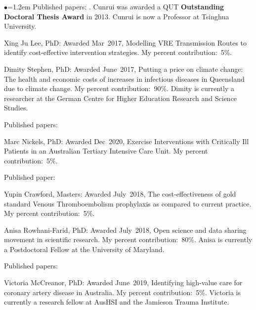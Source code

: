 \documentclass[a4paper,11pt]{article}
\renewcommand{\labelitemi}{$\bullet$}
\begin{document}
\begin{raggedright}
\begin{list}{\labelitemi}{\leftmargin=1.2em}
Published papers: . Cunrui was awarded a QUT \textbf{Outstanding Doctoral Thesis Award} in 2013. Cunrui is now a Professor at Tsinghua University.

\item Xing Ju Lee, PhD: Awarded Mar~2017, Modelling VRE Transmission Routes to identify cost-effective intervention strategies. My percent contribution:~5\%.

\item Dimity Stephen, PhD: Awarded June~2017, Putting a price on climate change: The health and economic costs of increases in infectious diseases in Queensland due to climate change. My percent contribution:~90\%. Dimity is currently a researcher at the German Centre for Higher Education Research and Science Studies.

Published papers: 

\item Marc Nickels, PhD: Awarded Dec~2020, Exercise Interventions with Critically Ill Patients in an Australian Tertiary Intensive Care Unit. My percent contribution:~5\%.

Published paper: 

\item Yupin Crawford, Masters: Awarded July~2018, The cost-effectiveness of gold standard Venous Thromboembolism prophylaxis as compared to current practice. My percent contribution:~5\%.

\item Anisa Rowhani-Farid, PhD: Awarded July~2018, Open science and data sharing movement in scientific research. My percent contribution:~80\%. Anisa is currently a Postdoctoral Fellow at the University of Maryland.

Published papers: 

\item Victoria McCreanor, PhD: Awarded June~2019, Identifying high-value care for coronary artery disease in Australia. My percent contribution:~5\%. Victoria is currently a research fellow at AusHSI and the Jamieson Trauma Institute.


\end{list}
\end{raggedright}
\end{document}
